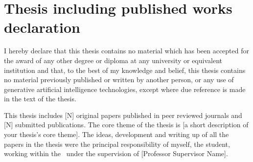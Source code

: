 %
\chapter*{\Large Thesis including published works declaration}

I hereby declare that this thesis contains no material which has been
accepted for the award of any other degree or diploma at any university or
equivalent institution and that, to the best of my knowledge and belief, this
thesis contains no material previously published or written by another
person, or any use of generative artificial intelligence technologies, except
where due reference is made in the text of the thesis.

\bigskip

This thesis includes
[N] original papers published in peer reviewed journals and [N] submitted
publications.
The core theme of the thesis is
[a short description of your thesis's core theme].
The ideas, development and writing up of all the papers in the thesis were the
principal responsibility of myself, the student, working within the
\thesisschool\ under the supervision of
[Professor Supervisor Name].


